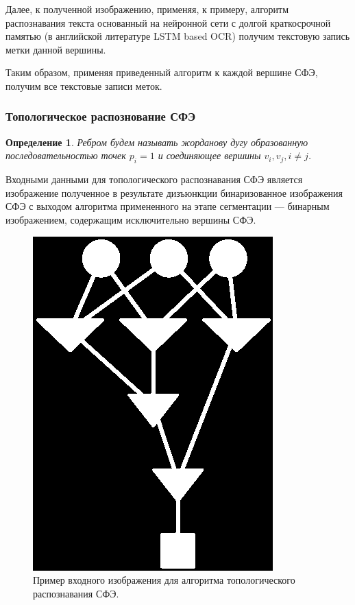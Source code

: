 \documentclass[makeidx, a4paper, 14pt]{extarticle}
\newtheorem{definition}{Определение}
\begin{document}
Далее, к полученной изображению, применяя, к примеру, алгоритм распознавания текста основанный на нейронной сети с долгой краткосрочной памятью (в английской литературе LSTM based OCR) \cite{adnan16, tesseract}
получим текстовую запись метки данной вершины.

Таким образом, применяя приведенный алгоритм к каждой вершине СФЭ, получим все текстовые записи меток.

\subsubsection{Топологическое распознование СФЭ}

\begin{definition}
    Ребром будем называть жорданову дугу образованную последовательностью точек ${p_i=1}$
    и соединяющее вершины ${v_i, v_j, i \neq j}$.
\end{definition}


Входными данными для топологического распознавания СФЭ является изображение полученное в результате дизъюнкции бинаризованное изображения СФЭ
с выходом алгоритма примененного на этапе сегментации --- бинарным изображением, содержащим исключительно вершины СФЭ.

\begin{figure}[H]
    \centering
    \includegraphics[scale=0.75]{img4_binarized_bfd.png}
    \caption{Пример входного изображения для алгоритма топологического распознавания СФЭ.}
    \label{fig:bfd}
\end{figure}
\end{document}
